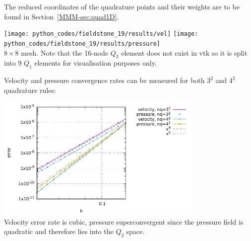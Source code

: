 The reduced coordinates of the quadrature points and their weights are to be found in 
Section~\ref{MMM-sec:quad1D}.

\begin{center}
\texttt{[image: python\_codes/fieldstone\_19/results/vel]}
\texttt{[image: python\_codes/fieldstone\_19/results/pressure]}\\
{\captionfont $8\times 8$ mesh. Note that the 16-node $Q_3$ element does not 
exist in vtk so it is split into 9 $Q_1$ elements for visualisation purposes only.}
\end{center}

Velocity and pressure convergence rates can be measured for both $3^2$ and $4^2$
quadrature rules:
\begin{center}
\includegraphics[width=10cm]{python_codes/fieldstone_19/results/errors}\\
{\captionfont Velocity error rate is cubic, pressure superconvergent since the pressure field
is quadratic and therefore lies into the $Q_2$ space.}
\end{center}

